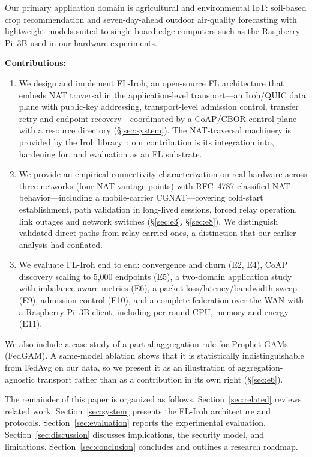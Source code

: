 \documentclass[a4paper,fleqn]{cas-dc}
\begin{document}
Our primary application domain is agricultural and environmental IoT: soil-based crop recommendation and seven-day-ahead outdoor air-quality forecasting with lightweight models suited to single-board edge computers such as the Raspberry Pi~3B used in our hardware experiments.

\noindent\textbf{Contributions:}
\begin{enumerate}
    \item We design and implement FL-Iroh, an open-source FL architecture that embeds NAT traversal in the application-level transport---an Iroh\slash QUIC data plane with public-key addressing, transport-level admission control, transfer retry and endpoint recovery---coordinated by a CoAP\slash CBOR control plane with a resource directory (\S\ref{sec:system}). The NAT-traversal machinery is provided by the Iroh library~\cite{iroh2024}; our contribution is its integration into, hardening for, and evaluation as an FL substrate.
    \item We provide an empirical connectivity characterization on real hardware across three networks (four NAT vantage points) with RFC~4787-classified NAT behavior---including a mobile-carrier CGNAT---covering cold-start establishment, path validation in long-lived sessions, forced relay operation, link outages and network switches (\S\ref{sec:e3}, \S\ref{sec:e8}). We distinguish validated direct paths from relay-carried ones, a distinction that our earlier analysis had conflated.
    \item We evaluate FL-Iroh end to end: convergence and churn (E2, E4), CoAP discovery scaling to 5{,}000 endpoints (E5), a two-domain application study with imbalance-aware metrics (E6), a packet-loss/latency/bandwidth sweep (E9), admission control (E10), and a complete federation over the WAN with a Raspberry Pi~3B client, including per-round CPU, memory and energy (E11).
\end{enumerate}

We also include a case study of a partial-aggregation rule for Prophet GAMs (FedGAM). A same-model ablation shows that it is statistically indistinguishable from FedAvg on our data, so we present it as an illustration of aggregation-agnostic transport rather than as a contribution in its own right (\S\ref{sec:e6}).

The remainder of this paper is organized as follows. Section~\ref{sec:related} reviews related work. Section~\ref{sec:system} presents the FL-Iroh architecture and protocols. Section~\ref{sec:evaluation} reports the experimental evaluation. Section~\ref{sec:discussion} discusses implications, the security model, and limitations. Section~\ref{sec:conclusion} concludes and outlines a research roadmap.
\end{document}
